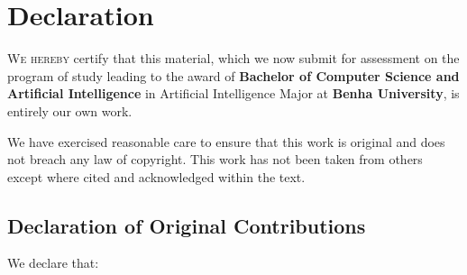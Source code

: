 \section{Declaration}
\label{sec:Declaration}

\lettrine{W}{e hereby} certify that this material, which we now submit for assessment on the program of study leading to the award of \textbf{Bachelor of Computer Science and Artificial Intelligence} in \textcolor{brandPrimary}{Artificial Intelligence Major} at \textbf{Benha University}, is entirely our own work.

\vspace{0.8em}

\begin{infobox}[title=Academic Integrity Statement]
We have exercised reasonable care to ensure that this work is original and does not breach any law of copyright. This work has not been taken from others except where cited and acknowledged within the text.
\end{infobox}

\vspace{0.8em}

\subsection*{Declaration of Original Contributions}

We declare that:


